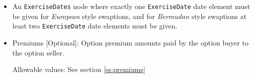 \begin{itemize}
\item An \lstinline!ExerciseDates! node where exactly one \lstinline!ExerciseDate! date element must be given for \emph{European} style swaptions, and for \emph{Bermudan} style swaptions  at least two \lstinline!ExerciseDate! date elements must be given. \\

\item Premiums [Optional]: Option premium amounts paid by the option buyer to the option seller.

Allowable values:  See section \ref{ss:premiums}

\end{itemize}



